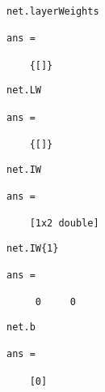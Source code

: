 \begin{verbatim}
net.layerWeights

ans = 

    {[]}
\end{verbatim}

\begin{verbatim}
net.LW

ans = 

    {[]}
\end{verbatim}

\begin{verbatim}
net.IW

ans = 

    [1x2 double]
\end{verbatim}

\begin{verbatim}
net.IW{1}

ans =

     0     0
\end{verbatim}

\begin{verbatim}
net.b

ans = 

    [0]
\end{verbatim}
